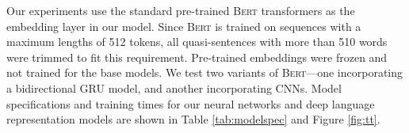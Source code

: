 \documentclass[11pt]{article}
\begin{document}
Our experiments use the standard pre-trained \textsc{Bert} transformers as the embedding layer in our model.
Since \textsc{Bert} is trained on sequences with a maximum lengths of 512 tokens, %
 all quasi-sentences with more than 510 words were trimmed to fit this requirement. Pre-trained embeddings were frozen and not trained for the base models. We test two variants of \textsc{Bert}---one incorporating a bidirectional GRU model, and another incorporating CNNs.
Model specifications and training times for our neural networks and deep language representation models are shown in Table \ref{tab:modelspec} and Figure \ref{fig:tt}.

\end{document}
